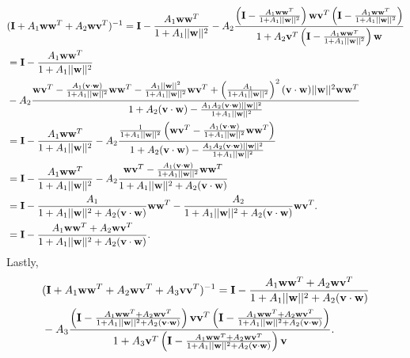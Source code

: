 \documentclass[11pt]{article}
\begin{document}
\begin{align*}
	&(\mathbf{I} + A_1 \mathbf{ww}^T + A_2 \mathbf{wv}^T)^{-1} = \mathbf{I} - \frac{A_1 \mathbf{ww}^T}{1 + A_1 ||\mathbf{w}||^2} - A_2\frac{\left(\mathbf{I} - \frac{A_1 \mathbf{ww}^T}{1 + A_1 ||\mathbf{w}||^2}\right)\mathbf{wv}^T \left(\mathbf{I} - \frac{A_1 \mathbf{ww}^T}{1 + A_1 ||\mathbf{w}||^2}\right)}{1 + A_2\mathbf{v}^T \left(\mathbf{I} - \frac{A_1 \mathbf{ww}^T}{1 + A_1 ||\mathbf{w}||^2}\right)\mathbf{w}} \\
	&= \mathbf{I} -  \frac{A_1 \mathbf{ww}^T}{1 + A_1 ||\mathbf{w}||^2} \notag \\
	&-A_2\frac{\mathbf{wv}^T - \frac{A_1(\mathbf{v}\cdot \mathbf{w})}{1+ A_1||\mathbf{w}||^2} \mathbf{ww}^T - \frac{A_1||\mathbf{w}||^2}{1+ A_1||\mathbf{w}||^2} \mathbf{wv}^T  + \left(\frac{A_1}{1+ A_1||\mathbf{w}||^2}\right)^2 (\mathbf{v}\cdot \mathbf{w}) ||\mathbf{w}||^2 \mathbf{ww}^T}{1 + A_2 (\mathbf{v}\cdot \mathbf{w}) - \frac{A_1 A_2 (\mathbf{v}\cdot\mathbf{w}) ||\mathbf{w}||^2}{1 + A_1 ||\mathbf{w}||^2}} \\
	&=  \mathbf{I} -  \frac{A_1 \mathbf{ww}^T}{1 + A_1 ||\mathbf{w}||^2}  - A_2\frac{\frac{1}{1+ A_1||\mathbf{w}||^2} \left(\mathbf{wv}^T -\frac{A_1 (\mathbf{v}\cdot \mathbf{w})}{1 + A_1 ||\mathbf{w}||^2} \mathbf{ww}^T\right)}{1 + A_2 (\mathbf{v}\cdot \mathbf{w}) - \frac{A_1 A_2 (\mathbf{v}\cdot\mathbf{w}) ||\mathbf{w}||^2}{1 + A_1 ||\mathbf{w}||^2}}\\
	&= \mathbf{I} -  \frac{A_1 \mathbf{ww}^T}{1 + A_1 ||\mathbf{w}||^2} - A_2\frac{\mathbf{wv}^T -\frac{A_1 (\mathbf{v}\cdot \mathbf{w})}{1 + A_1 ||\mathbf{w}||^2} \mathbf{ww}^T}{1 + A_1 ||\mathbf{w}||^2 + A_2 (\mathbf{v} \cdot \mathbf{w})} \\
	&= \mathbf{I} - \frac{A_1}{1 + A_1 ||\mathbf{w}||^2 + A_2 (\mathbf{v}\cdot \mathbf{w})} \mathbf{ww}^T - \frac{A_2}{1 + A_1 ||\mathbf{w}||^2 + A_2(\mathbf{v}\cdot \mathbf{w})}\mathbf{wv}^T.\\
	&= \mathbf{I} - \frac{A_1 \mathbf{ww}^T + A_2 \mathbf{wv}^T}{1 + A_1 ||\mathbf{w}||^2 + A_2 (\mathbf{v}\cdot\mathbf{w})}.
\end{align*}
Lastly, 
\begin{align}
	&(\mathbf{I} + A_1 \mathbf{ww}^T + A_2 \mathbf{wv}^T + A_3 \mathbf{vv}^T)^{-1} = \mathbf{I} - \frac{A_1 \mathbf{ww}^T + A_2 \mathbf{wv}^T}{1 + A_1 ||\mathbf{w}||^2 + A_2 (\mathbf{v}\cdot\mathbf{w})} \notag \\
	&-A_3 \frac{\left(\mathbf{I} - \frac{A_1 \mathbf{ww}^T + A_2 \mathbf{wv}^T}{1 + A_1 ||\mathbf{w}||^2 + A_2 (\mathbf{v}\cdot\mathbf{w})}\right)\mathbf{vv}^T \left(\mathbf{I} - \frac{A_1 \mathbf{ww}^T + A_2 \mathbf{wv}^T}{1 + A_1 ||\mathbf{w}||^2 + A_2 (\mathbf{v}\cdot\mathbf{w})}\right)}{1 + A_3 \mathbf{v}^T \left(\mathbf{I} - \frac{A_1 \mathbf{ww}^T + A_2 \mathbf{wv}^T}{1 + A_1 ||\mathbf{w}||^2 + A_2 (\mathbf{v}\cdot\mathbf{w})}\right)\mathbf{v}}.
\end{align}
\end{document}
